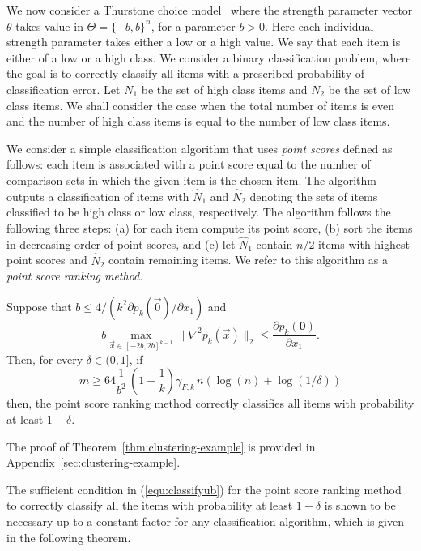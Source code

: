 We now consider a Thurstone choice model \GT\ where the strength parameter vector $\theta$ takes value in $\Theta = \{-b,b\}^n$, for a parameter $b > 0$. Here each individual strength parameter takes either a low or a high value. We say that each item is either of a low or a high class. We consider a binary classification problem, where the goal is to correctly classify all items with a prescribed probability of classification error. Let $N_1$ be the set of high class items and $N_2$ be the set of low class items. We shall consider the case when the total number of items is even and the number of high class items is equal to the number of low class items. 

We consider a simple classification algorithm that uses \emph{point scores} defined as follows: each item is associated with a point score equal to the number of comparison sets in which the given item is the chosen item. The algorithm outputs a classification of items with $\widehat N_1$ and $\widehat N_2$ denoting the sets of items classified to be high class or low class, respectively. The algorithm follows the following three steps: (a) for each item compute its point score, (b) sort the items in decreasing order of point scores, and (c) let $\widehat{N}_1$ contain $n/2$ items with highest point scores and $\widehat{N}_2$ contain remaining items. We refer to this algorithm as a \emph{point score ranking method}.

\begin{theorem} Suppose that $b \leq 4/(k^2 \partial p_k(\vec{0})/\partial x_1)$ and
\begin{equation}
b \max_{\vec{x}\in [-2b,2b]^{k-1}} \|\nabla^2 p_k (\vec{x}) \|_2 \le \frac{\partial p_k ({\bm 0})}{\partial x_1}.
\label{equ:bcond}
\end{equation}
Then, for every $\delta \in (0,1]$, if
\begin{equation}
m \ge 64 \frac{1}{b^2}\, \left(1-\frac{1}{k}\right)\gamma_{F,k}\, n(\log(n) + \log(1/\delta))
\label{equ:classifyub}
\end{equation}
then, the point score ranking method correctly classifies all items with probability at least $1-\delta$.
\label{thm:clustering-example}
\end{theorem}

The proof of Theorem~\ref{thm:clustering-example} is provided in Appendix~\ref{sec:clustering-example}. 

The sufficient condition in (\ref{equ:classifyub}) for the point score ranking method to correctly classify all the items with probability at least $1-\delta$ is shown to be necessary up to a constant-factor for any classification algorithm, which is given in the following theorem. 

